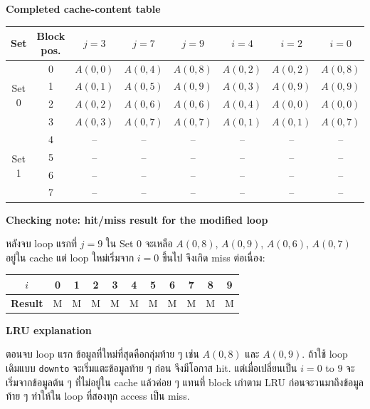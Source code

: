 \documentclass[a4paper,12pt]{article}
\begin{document}
\textbf{Completed cache-content table}
\begin{center}
\small
\begin{tabular}{|c|c|c|c|c|c|c|c|}
\hline
\textbf{Set} & \textbf{Block pos.} & \textbf{$j=3$} & \textbf{$j=7$} & \textbf{$j=9$} & \textbf{$i=4$} & \textbf{$i=2$} & \textbf{$i=0$} \\
\hline
\multirow{4}{*}{Set 0} & 0 & $A(0,0)$ & $A(0,4)$ & $A(0,8)$ & $A(0,2)$ & $A(0,2)$ & $A(0,8)$ \\
\cline{2-8}
& 1 & $A(0,1)$ & $A(0,5)$ & $A(0,9)$ & $A(0,3)$ & $A(0,9)$ & $A(0,9)$ \\
\cline{2-8}
& 2 & $A(0,2)$ & $A(0,6)$ & $A(0,6)$ & $A(0,4)$ & $A(0,0)$ & $A(0,0)$ \\
\cline{2-8}
& 3 & $A(0,3)$ & $A(0,7)$ & $A(0,7)$ & $A(0,1)$ & $A(0,1)$ & $A(0,7)$ \\
\hline
\multirow{4}{*}{Set 1} & 4 & -- & -- & -- & -- & -- & -- \\
\cline{2-8}
& 5 & -- & -- & -- & -- & -- & -- \\
\cline{2-8}
& 6 & -- & -- & -- & -- & -- & -- \\
\cline{2-8}
& 7 & -- & -- & -- & -- & -- & -- \\
\hline
\end{tabular}
\end{center}

\textbf{Checking note: hit/miss result for the modified loop}

หลังจบ loop แรกที่ $j=9$ ใน Set 0 จะเหลือ $A(0,8)$, $A(0,9)$, $A(0,6)$, $A(0,7)$ อยู่ใน cache แต่ loop ใหม่เริ่มจาก $i=0$ ขึ้นไป จึงเกิด miss ต่อเนื่อง:

\begin{center}
\begin{tabular}{|c|c|c|c|c|c|c|c|c|c|c|}
\hline
\textbf{$i$} & 0 & 1 & 2 & 3 & 4 & 5 & 6 & 7 & 8 & 9 \\
\hline
\textbf{Result} & M & M & M & M & M & M & M & M & M & M \\
\hline
\end{tabular}
\end{center}

\textbf{LRU explanation}

ตอนจบ loop แรก ข้อมูลที่ใหม่ที่สุดคือกลุ่มท้าย ๆ เช่น $A(0,8)$ และ $A(0,9)$. ถ้าใช้ loop เดิมแบบ \texttt{downto} จะเริ่มแตะข้อมูลท้าย ๆ ก่อน จึงมีโอกาส hit. แต่เมื่อเปลี่ยนเป็น $i=0$ to $9$ จะเริ่มจากข้อมูลต้น ๆ ที่ไม่อยู่ใน cache แล้วค่อย ๆ แทนที่ block เก่าตาม LRU ก่อนจะวนมาถึงข้อมูลท้าย ๆ ทำให้ใน loop ที่สองทุก access เป็น miss.
\end{document}
